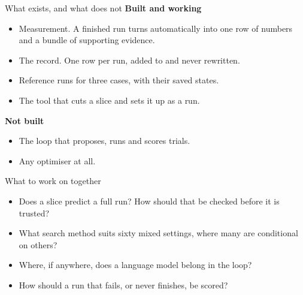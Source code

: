 \documentclass[aspectratio=169,11pt]{beamer}
\begin{document}
\begin{frame}{What exists, and what does not}
  \textbf{Built and working}
  \begin{itemize}
    \item Measurement. A finished run turns automatically into one row of
          numbers and a bundle of supporting evidence.
    \item The record. One row per run, added to and never rewritten.
    \item Reference runs for three cases, with their saved states.
    \item The tool that cuts a slice and sets it up as a run.
  \end{itemize}

  \vspace{0.8em}
  \textbf{Not built}
  \begin{itemize}
    \item The loop that proposes, runs and scores trials.
    \item Any optimiser at all.
  \end{itemize}
\end{frame}

\begin{frame}{What to work on together}
  \begin{itemize}
    \setlength{\itemsep}{0.7em}
    \item Does a slice predict a full run? How should that be checked before it
          is trusted?
    \item What search method suits sixty mixed settings, where many are
          conditional on others?
    \item Where, if anywhere, does a language model belong in the loop?
    \item How should a run that fails, or never finishes, be scored?
  \end{itemize}
\end{frame}
\end{document}

